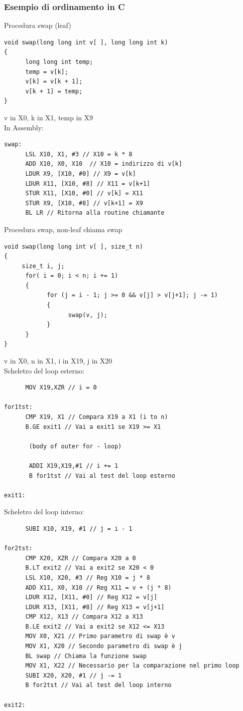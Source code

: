 \documentclass[12pt,a4paper]{article}
\begin{document}
\subsubsection{Esempio di ordinamento in C}
Procedura swap (leaf)
\begin{verbatim}
void swap(long long int v[ ], long long int k)
{
      long long int temp;
      temp = v[k];
      v[k] = v[k + 1];
      v[k + 1] = temp;
}
\end{verbatim}
v in X0, k in X1, temp in X9\\
In Assembly:
\begin{verbatim}
swap:
      LSL X10, X1, #3 // X10 = k * 8
      ADD X10, X0, X10  // X10 = indirizzo di v[k]
      LDUR X9, [X10, #0] // X9 = v[k]
      LDUR X11, [X10, #8] // X11 = v[k+1]
      STUR X11, [X10, #0] // v[k] = X11
      STUR X9, [X10, #8] // v[k+1] = X9
      BL LR // Ritorna alla routine chiamante
\end{verbatim}

\Sep
\noindent
Procedura swap, non-leaf chiama swap
\begin{verbatim}
void swap(long long int v[ ], size_t n)
{
     size_t i, j;
      for( i = 0; i < n; i += 1)
      {
            for (j = i - 1; j >= 0 && v[j] > v[j+1]; j -= 1)
            {
                  swap(v, j);
            }
      }
}
\end{verbatim}
v in X0, n in X1, i in X19, j in X20\\
Scheletro del loop esterno:
\begin{verbatim}
      MOV X19,XZR // i = 0
      
for1tst:
      CMP X19, X1 // Compara X19 a X1 (i to n)
      B.GE exit1 // Vai a exit1 se X19 >= X1
      
       (body of outer for - loop)
       
       ADDI X19,X19,#1 // i += 1
       B for1tst // Vai al test del loop esterno
       
exit1:
\end{verbatim}

\Sep \noindent
Scheletro del loop interno:
\begin{verbatim}
      SUBI X10, X19, #1 // j = i - 1
      
for2tst:
      CMP X20, XZR // Compara X20 a 0
      B.LT exit2 // Vai a exit2 se X20 < 0
      LSL X10, X20, #3 // Reg X10 = j * 8
      ADD X11, X0, X10 // Reg X11 = v + (j * 8)
      LDUR X12, [X11, #0] // Reg X12 = v[j]
      LDUR X13, [X11, #8] // Reg X13 = v[j+1]
      CMP X12, X13 // Compara X12 a X13
      B.LE exit2 // Vai a exit2 se X12 <= X13
      MOV X0, X21 // Primo parametro di swap è v
      MOV X1, X20 // Secondo parametro di swap è j
      BL swap // Chiama la funzione swap
      MOV X1, X22 // Necessario per la comparazione nel primo loop
      SUBI X20, X20, #1 // j -= 1
      B for2tst // Vai al test del loop interno
      
exit2:
\end{verbatim}
\end{document}
